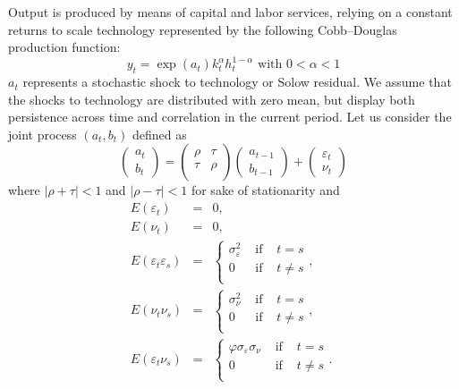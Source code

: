 \documentclass[11pt,a4paper]{article}
\begin{document}
Output is produced by means of capital and labor services, relying on a constant returns to scale technology represented by the following Cobb--Douglas production function:
\begin{equation}
 y_t=\exp(a_t) k_t^\alpha h_t^{1-\alpha} \mbox{ with }0<\alpha<1 \label{eq:prod}
\end{equation}
$a_t$ represents a stochastic shock to technology or Solow residual. We assume that the shocks to technology are distributed with zero mean, but display both persistence across time and correlation in the current period.
Let us consider the joint process $(a_t,b_t)$ defined as
\begin{equation}
\left(
\begin{array}{c}
a_t\\b_t
\end{array}
\right)=
\left(
\begin{array}{cc}
\rho&\tau\\
\tau&\rho\\ 
\end{array}
\right)\left(
\begin{array}{c}
a_{t-1}\\b_{t-1}
\end{array}
\right)
+\left(
\begin{array}{c}
\varepsilon_t\\ \nu_t
\end{array}
\right)  \label{eq:process}
\end{equation}
where $|\rho+\tau|<1$ and $|\rho-\tau|<1 $ for sake of stationarity and 
\begin{eqnarray*}
E(\varepsilon_t)&=& 0,\\
E(\nu_t)&=& 0,\\
E(\varepsilon_t\varepsilon_s)&=&\left\{
\begin{array}{lcl}
\sigma^2_\varepsilon & \mbox{ if } & t=s \\
0 & \mbox{ if } & t\neq s \\
\end{array}\right. \mbox{, }\\ 
E(\nu_t\nu_s)&=&\left\{
\begin{array}{lcl}
\sigma^2_\nu & \mbox{ if } & t=s \\
0 & \mbox{ if } & t\neq s \\
\end{array}\right. \mbox{, } \\
E(\varepsilon_t\nu_s)&=&\left\{
\begin{array}{lcl}
\varphi\sigma_\varepsilon\sigma_\nu & \mbox{ if } & t=s \\
0 & \mbox{ if } & t\neq s \\
\end{array}\right. \mbox{. } 
\end{eqnarray*}
\end{document}
